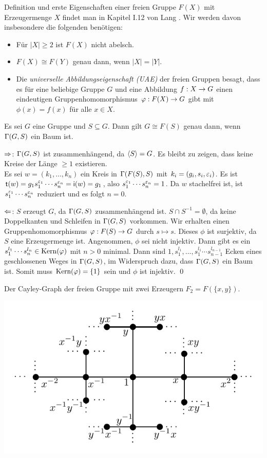 \documentclass[a4paper, 12pt, twoside]{article}
\begin{document}
Definition und erste Eigenschaften einer freien Gruppe $F(X)$
mit Erzeugermenge $X$ findet man in Kapitel I.12 von Lang \cite{lang}.
Wir werden davon insbesondere die folgenden benötigen:
\begin{itemize}
\item Für $|X|\geq 2$ ist $F(X)$ nicht abelsch.
\item $F(X)\cong F(Y)$ genau dann, wenn $|X|=|Y|$.
\item Die \emph{universelle Abbildungseigenschaft (UAE)}
der freien Gruppen besagt, dass es für eine beliebige Gruppe $G$ und
eine Abbildung $f:X\rightarrow G$ einen eindeutigen Gruppenhomomorphismus
$\varphi:F(X)\rightarrow G$ gibt mit $\phi(x)=f(x)$ für alle $x\in X$.
\end{itemize}

\PROP\label{prop_freibaum}
Es sei $G$ eine Gruppe und $S\subseteq G$. Dann gilt
$G\cong F(S)$ genau dann, wenn $\Gamma(G,S)$ ein Baum ist.

\bew \glqq$\Rightarrow$\grqq:
$\Gamma(G,S)$ ist zusammenhängend, da $\langle S\rangle=G$. Es bleibt zu
zeigen, dass keine Kreise der Länge $\geq 1$ existieren.\\
Es sei $w=(k_1,\ldots,k_n)$ ein Kreis in $\Gamma(F(S),S)$ mit
$k_i=(g_i,s_i,\varepsilon_i)$.
Es ist $\mathsf{t}(w)=g_1 s_1^{\varepsilon_1}\cdots s_n^{\varepsilon_n}
=\mathsf{i}(w)=g_1$, also $s_1^{\varepsilon_1}\cdots s_n^{\varepsilon_n}=1$.
Da $w$ stachelfrei ist, ist $s_1^{\varepsilon_1}\cdots s_n^{\varepsilon_n}$
reduziert und es folgt $n=0$.

\glqq$\Leftarrow$\grqq:
$S$ erzeugt $G$, da $\Gamma(G,S)$ zusammenhängend ist.
$S\cap S^{-1}=\emptyset$, da keine Doppelkanten und Schleifen
in $\Gamma(G,S)$ vorkommen. Wir erhalten einen Gruppenhomomorphismus
$\varphi:F(S)\rightarrow G$ durch $s\mapsto s$.
Dieses $\phi$ ist surjektiv, da $S$ eine Erzeugermenge ist.
Angenommen, $\phi$ sei nicht injektiv. Dann gibt es ein
$s_1^{l_1}\cdots s_n^{l_n} \in \mathrm{Kern}(\varphi)$ mit $n>0$ minimal.
Dann sind $1,s_1^{l_1},\ldots,s_1^{l_1}\cdots s_{n-1}^{l_{n-1}}$
Ecken eines geschlossenen Weges in $\Gamma(G,S)$, im Widerspruch dazu,
dass $\Gamma(G,S)$ ein Baum ist. Somit muss $\mathrm{Kern}(\varphi)=\{1\}$ sein
und $\phi$ ist injektiv.
\qed

\BSP Der Cayley-Graph der freien Gruppe mit zwei Erzeugern
$F_2=F(\{x,y\})$.
\begin{center}
	\includegraphics{grugraImages/Fxy}
\end{center}
\end{document}

